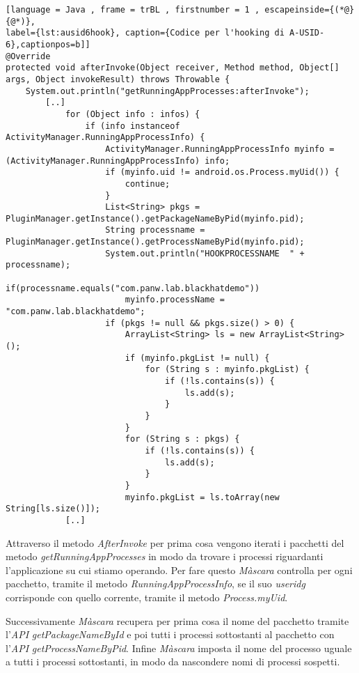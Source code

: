 \begin{lstlisting}[language = Java , frame = trBL , firstnumber = 1 , escapeinside={(*@}{@*)},
label={lst:ausid6hook}, caption={Codice per l'hooking di A-USID-6},captionpos=b]]
@Override
protected void afterInvoke(Object receiver, Method method, Object[] args, Object invokeResult) throws Throwable {
    System.out.println("getRunningAppProcesses:afterInvoke");
        [..]
            for (Object info : infos) {
                if (info instanceof ActivityManager.RunningAppProcessInfo) {
                    ActivityManager.RunningAppProcessInfo myinfo = (ActivityManager.RunningAppProcessInfo) info;
                    if (myinfo.uid != android.os.Process.myUid()) {
                        continue;
                    }
                    List<String> pkgs = PluginManager.getInstance().getPackageNameByPid(myinfo.pid);
                    String processname = PluginManager.getInstance().getProcessNameByPid(myinfo.pid);
                    System.out.println("HOOKPROCESSNAME  " + processname);
                    if(processname.equals("com.panw.lab.blackhatdemo"))
                        myinfo.processName = "com.panw.lab.blackhatdemo";
                    if (pkgs != null && pkgs.size() > 0) {
                        ArrayList<String> ls = new ArrayList<String>();
                        if (myinfo.pkgList != null) {
                            for (String s : myinfo.pkgList) {
                                if (!ls.contains(s)) {
                                    ls.add(s);
                                }
                            }
                        }
                        for (String s : pkgs) {
                            if (!ls.contains(s)) {
                                ls.add(s);
                            }
                        }
                        myinfo.pkgList = ls.toArray(new String[ls.size()]);
            [..]
\end{lstlisting}

Attraverso il metodo \emph{AfterInvoke} per prima cosa vengono iterati i pacchetti del metodo \emph{getRunningAppProcesses} in modo da trovare i processi riguardanti l'applicazione su cui stiamo operando. Per fare questo \emph{Màscara} controlla per ogni pacchetto, tramite il metodo \emph{RunningAppProcessInfo}, se il suo \emph{\gls{useridg}} corrisponde con quello corrente, tramite il metodo \emph{Process.myUid}.

Successivamente \emph{Màscara} recupera per prima cosa il nome del pacchetto tramite l'\emph{API} \emph{getPackageNameById} e poi tutti i processi sottostanti al pacchetto con l'\emph{API} \emph{getProcessNameByPid}. Infine \emph{Màscara} imposta il nome del processo uguale a tutti i processi sottostanti, in modo da nascondere nomi di processi sospetti. 

